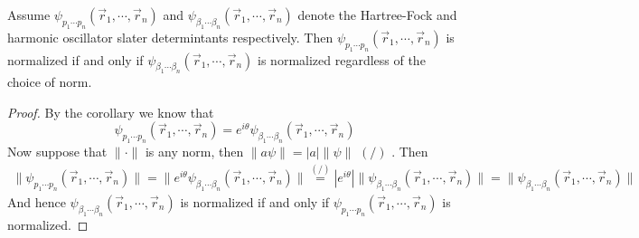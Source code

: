 \documentclass[11pt,english,a4paper]{article}
\begin{document}
\begin{corollary}
Assume $\psi_{  p_1\cdots p_n}(\vec{r}_1,\cdots, \vec{r}_n)$ and $\psi_{  \beta_1\cdots \beta_n}(\vec{r}_1,\cdots, \vec{r}_n)$ denote the Hartree-Fock and harmonic oscillator slater determintants respectively. Then $\psi_{  p_1\cdots p_n}(\vec{r}_1,\cdots, \vec{r}_n)$ is normalized if and only if $\psi_{  \beta_1\cdots \beta_n}(\vec{r}_1,\cdots, \vec{r}_n)$ is normalized regardless of the choice of norm.
\end{corollary}
\begin{proof}
By the corollary we know that
\[
\psi_{  p_1\cdots p_n}(\vec{r}_1,\cdots, \vec{r}_n) = e^{ i \theta}\psi_{  \beta_1\cdots \beta_n}(\vec{r}_1,\cdots, \vec{r}_n) 
\]
Now suppose that $\|\cdot \|$ is any norm, then $\|a \psi \| = |a| \| \psi \|$ $(/)$ \parencite[124]{lindstrom_mathematical_2016}. Then
\begin{align*}
\|\psi_{  p_1\cdots p_n}(\vec{r}_1,\cdots, \vec{r}_n) \| = \|e^{ i \theta}\psi_{  \beta_1\cdots \beta_n}(\vec{r}_1,\cdots, \vec{r}_n)\| \stackrel{(/)}{=} |e^{ i \theta}|\|\psi_{  \beta_1\cdots \beta_n}(\vec{r}_1,\cdots, \vec{r}_n)\| = \|\psi_{  \beta_1\cdots \beta_n}(\vec{r}_1,\cdots, \vec{r}_n)\|
\end{align*}
And hence $\psi_{  \beta_1\cdots \beta_n}(\vec{r}_1,\cdots, \vec{r}_n)$ is normalized if and only if $\psi_{  p_1\cdots p_n}(\vec{r}_1,\cdots, \vec{r}_n)$ is normalized.
\end{proof}
\end{document}
